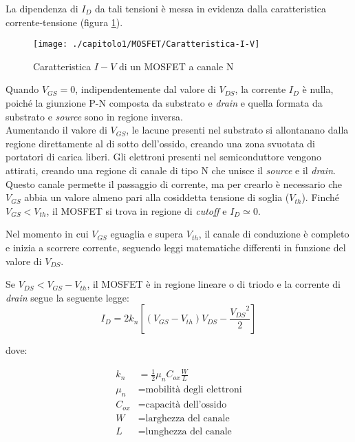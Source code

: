 La dipendenza di $I_D$ da tali tensioni è messa in evidenza dalla caratteristica corrente-tensione (figura \ref{fig:caratteristica-I-V}).

\begin{figure}[h]
  \centering
  \texttt{[image: ./capitolo1/MOSFET/Caratteristica-I-V]}
  \caption[Caratteristica $I-V$ di un MOSFET a canale N]{Caratteristica $I-V$ di un MOSFET a canale N}
  \label{fig:caratteristica-I-V}
\end{figure}

Quando $V_{GS} = 0$, indipendentemente dal valore di $V_{DS}$, la corrente $I_D$ è nulla, poiché la giunzione P-N composta da substrato e \emph{drain} e quella formata da substrato e \emph{source} sono in regione inversa. \\
Aumentando il valore di $V_{GS}$, le lacune presenti nel substrato si allontanano dalla regione direttamente al di sotto dell'ossido, creando una
zona svuotata di portatori di carica liberi. Gli elettroni presenti nel semiconduttore
vengono attirati, creando una regione di canale di tipo N che unisce il
\emph{source} e il \emph{drain}. Questo canale permette il passaggio di corrente, ma per crearlo è necessario che $V_{GS}$ abbia un valore almeno pari alla cosiddetta tensione di soglia ($V_{th}$). Finché $V_{GS} < V_{th}$, il MOSFET si trova in regione di \emph{cutoff} e $I_D \simeq 0$.

Nel momento in cui $V_{GS}$ eguaglia e supera $V_{th}$, il canale di conduzione è completo e inizia a scorrere corrente, seguendo leggi matematiche differenti in funzione del valore di $V_{DS}$.

\vspace*{0.5cm}

Se $V_{DS} < V_{GS} -  V_{th}$, il MOSFET è in regione lineare o di triodo e la corrente di \emph{drain} segue la seguente legge:\\

\begin{equation}
  I_D = 2k_n\left[ \left(V_{GS}-V_{th}\right)V_{DS} - \frac{{V_{DS}}^2}{2}\right]
\end{equation}

dove:

\begin{align*}
   k_n &= \frac{1}{2}\mu_n C_{ox}\frac{W}{L} \\
   \mu_n &= \text{mobilità degli elettroni} \\
   C_{ox} &= \text{capacità dell'ossido} \\
   W &= \text{larghezza del canale} \\
   L &= \text{lunghezza del canale}
\end{align*}

